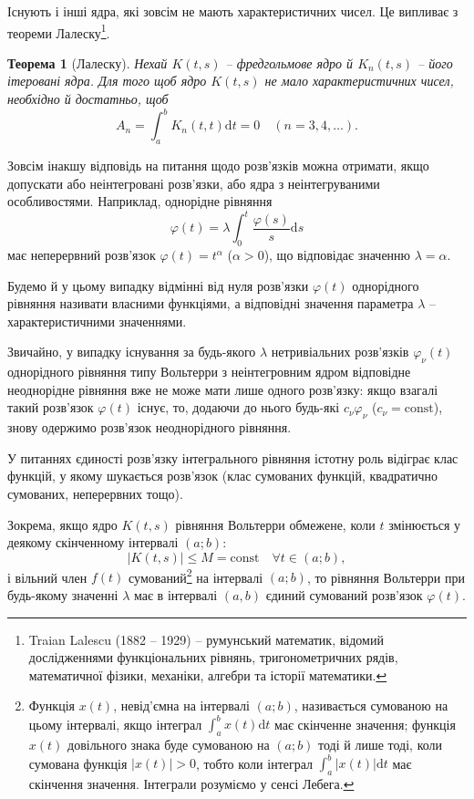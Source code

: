 \documentclass[14pt,twoside]{extreport}
\theoremstyle{mystyle}
\newtheorem{thm}{Теорема}
\numberwithin{equation}{chapter}
\begin{document}
Існують і інші ядра, які зовсім не мають характеристичних чисел. Це випливає з теореми Лалеску\footnote{Traian Lalescu (1882 -- 1929) -- румунський математик, відомий дослідженнями функціональних рівнянь, тригонометричних рядів, математичної фізики, механіки, алгебри та історії математики.}.

\begin{thm}[Лалеску]
	Нехай $K(t, s)$ -- фредгольмове ядро й $K_n(t, s)$ -- його ітеровані ядра. Для того щоб ядро $K(t, s)$ не мало характеристичних чисел, необхідно й достатньо, щоб
	\[
	A_n = \int_{a}^{b} K_n(t, t) \mathrm{d}t = 0 \quad (n=3, 4, \ldots).
	\]
\end{thm}

Зовсім інакшу відповідь на питання щодо розв'язків можна отримати, якщо допускати або неінтегровані розв'язки, або ядра з неінтегруваними особливостями. Наприклад, однорідне рівняння
\[
\varphi(t) = \lambda \int_{0}^{t} \frac{\varphi(s)}{s} \mathrm{d}s
\]
має неперервний розв'язок $\varphi(t) = t^\alpha$ ($\alpha > 0$), що відповідає значенню $\lambda = \alpha$.

Будемо й у цьому випадку відмінні від нуля розв'язки $\varphi(t)$ однорідного рівняння називати власними функціями, а відповідні значення параметра $\lambda$ -- характеристичними значеннями.

Звичайно, у випадку існування за будь-якого $\lambda$ нетривіальних розв'язків $\varphi_{\nu}(t)$ однорідного рівняння типу Вольтерри з неінтегровним ядром відповідне неоднорідне рівняння вже не може мати лише одного розв'язку: якщо взагалі такий розв'язок $\varphi(t)$ існує, то, додаючи до нього будь-які $c_{\nu}\varphi_{\nu}$ ($c_{\nu} = \textrm{const}$), знову одержимо розв'язок неоднорідного рівняння.

У питаннях єдиності розв'язку інтегрального рівняння істотну роль відіграє клас функцій, у якому шукається розв'язок (клас сумованих функцій, квадратично сумованих, неперервних тощо).

Зокрема, якщо ядро $K(t, s)$ рівняння Вольтерри обмежене, коли $t$ змінюється у деякому скінченному інтервалі $(a; b)$:
\[
|K(t, s)| \leqslant M = \textrm{const} \quad \forall t \in (a; b),
\]
і вільний член $f(t)$ сумований\footnote{Функція $x(t)$, невід'ємна на інтервалі $(a; b)$, називається сумованою на цьому інтервалі, якщо інтеграл $\int_{a}^{b} x(t) \mathrm{d}t$ має скінченне значення; функція $x(t)$ довільного знака буде сумованою на $(a; b)$ тоді й лише тоді, коли сумована функція $|x(t)|>0$, тобто коли інтеграл $\int_{a}^{b} |x(t)| \mathrm{d}t$ має скінчення значення. Інтеграли розуміємо у сенсі Лебега.} на інтервалі $(a; b)$, то рівняння Вольтерри при будь-якому значенні $\lambda$ має в інтервалі $(a, b)$ єдиний сумований розв'язок $\varphi(t)$.
\end{document}

